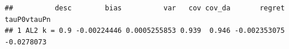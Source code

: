\documentclass[11pt]{article}\usepackage[]{graphicx}\usepackage[table]{xcolor}
\makeatletter
\newenvironment{kframe}{%
 \def\at@end@of@kframe{}%
 \ifinner\ifhmode%
  \def\at@end@of@kframe{\end{minipage}}%
  \begin{minipage}{\columnwidth}%
 \fi\fi%
 \def\FrameCommand##1{\hskip\@totalleftmargin \hskip-\fboxsep
 \colorbox{shadecolor}{##1}\hskip-\fboxsep
     \hskip-\linewidth \hskip-\@totalleftmargin \hskip\columnwidth}%
 \MakeFramed {\advance\hsize-\width
   \@totalleftmargin\z@ \linewidth\hsize
   \@setminipage}}%
 {\par\unskip\endMakeFramed%
 \at@end@of@kframe}
\newenvironment{knitrout}{}{} %
\makeatother
\begin{document}
\begin{knitrout}
\begin{kframe}\begin{verbatim}
##          desc        bias          var   cov cov_da       regret tauP0vtauPn
## 1 AL2 k = 0.9 -0.00224446 0.0005255853 0.939  0.946 -0.002353075  -0.0278073
\end{verbatim}
\end{kframe}
\end{knitrout}
\end{document}
